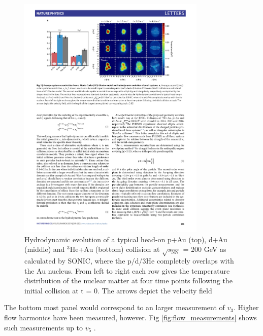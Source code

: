   \begin{figure}[htpb]
    \centering
    \includegraphics[width=0.8\textwidth]{Introduction/collision_geometries.pdf}
    \caption{Hydrodynamic evolution of a typical head-on p+Au (top), d+Au (middle) and $^3$He+Au (bottom) collision at $\sqrt{s_\mathrm{NN}}$ = 200 GeV as calculated by SONIC, where the p/d/3He completely overlaps with the Au nucleus. From left to right each row gives the temperature distribution of the nuclear matter at four time points following the initial collision at t = 0. The arrows depict the velocity field}
    \label{fig:collision_geometries}
  \end{figure}

  The bottom most panel would correspond to an larger measurement of $v_3$. Higher flow harmonics have been measured, however. Fig \ref{fig:flow_measurements} shows such measurements up to $v_5$ \cite{Aamodt2011}. 

